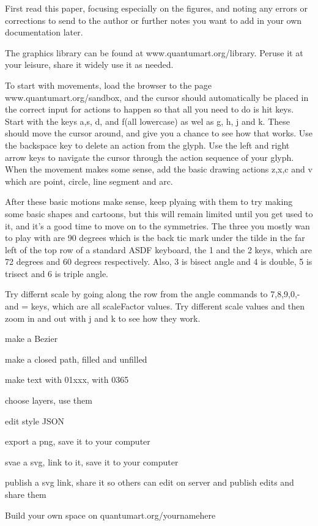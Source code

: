 \documentclass[11pt]{article}
\begin{document}
First read this paper, focusing especially on the figures, and noting any errors or corrections to send to the author or further notes you want to add in your own documentation later.

The graphics library can be found at www.quantumart.org/library.  Peruse it at your leisure, share it widely use it as needed.  

To start with movements, load the browser to the page www.quantumart.org/sandbox, and the cursor should automatically be placed in the correct input for actions to happen so that all you need to do is hit keys.  Start with the keys a,s, d, and f(all lowercase) as wel as g, h, j and k.  These should move the cursor around, and give you a chance to see how that works.  Use the backspace key to delete an action from the glyph.  Use the left and right arrow keys to navigate the cursor through the action sequence of your glyph.  When the movement makes some sense, add the basic drawing actions z,x,c and v which are point, circle, line segment and arc.  

After these basic motions make sense, keep plyaing with them to try making some basic shapes and cartoons, but this will remain limited until you get used to it, and it's a good time to move on to the symmetries.  The three you mostly wan to play with are 90 degrees which is the back tic mark under the tilde in the far left of the top row of a standard ASDF keyboard, the 1 and the 2 keys, which are 72 degrees and 60 degrees respectively.  Also, 3 is bisect angle and 4 is double, 5 is trisect and 6 is triple angle.

Try differnt scale by going along the row from the angle commands to 7,8,9,0,- and = keys, which are all scaleFactor values.  Try different scale values and then zoom in and out with j and k to see how they work.  

make a Bezier

make a closed path, filled and unfilled

make text with 01xxx, with 0365

choose layers, use them

edit style JSON

export a png, save it to your computer

svae a svg, link to it, save it to your computer

publish a svg link, share it so others can edit on server and publish edits and share them

Build your own space on quantumart.org/yournamehere
\end{document}
